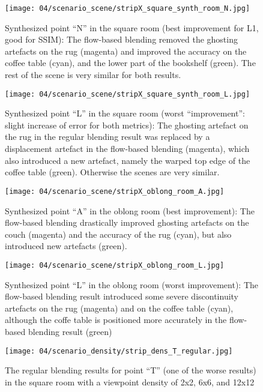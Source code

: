 \begin{figure}
  \centering
  \texttt{[image: 04/scenario\_scene/stripX\_square\_synth\_room\_N.jpg]}
  \caption[Synthesized point ``N'' in the square room]{Synthesized point ``N'' in the square room (best improvement for L1, good for SSIM): The flow-based blending removed the ghosting artefacts on the rug (magenta) and improved the accuracy on the coffee table (cyan), and the lower part of the bookshelf (green). The rest of the scene is very similar for both results.}
  \label{fig:scene_square_N}
\end{figure}

\begin{figure}
  \centering
  \texttt{[image: 04/scenario\_scene/stripX\_square\_synth\_room\_L.jpg]}
  \caption[Synthesized point ``L'' in the square scene]{Synthesized point ``L'' in the square room (worst ``improvement'': slight increase of error for both metrics): The ghosting artefact on the rug in the regular blending result was replaced by a displacement artefact in the flow-based blending (magenta), which also introduced a new artefact, namely the warped top edge of the coffee table (green). Otherwise the scenes are very similar.}
  \label{fig:scene_square_L}
\end{figure}

\begin{figure}
  \centering
  \texttt{[image: 04/scenario\_scene/stripX\_oblong\_room\_A.jpg]}
  \caption{Synthesized point ``A'' in the oblong room (best improvement): The flow-based blending drastically improved ghosting artefacts on the couch (magenta) and the accuracy of the rug (cyan), but also introduced new artefacts (green).}
  \label{fig:scene_oblong_A}
\end{figure}

\begin{figure}
  \centering
  \texttt{[image: 04/scenario\_scene/stripX\_oblong\_room\_L.jpg]}
  \caption{Synthesized point ``L'' in the oblong room (worst improvement): The flow-based blending result introduced some severe discontinuity artefacts on the rug (magenta) and on the coffee table (cyan), although the coffe table is positioned more accurately in the flow-based blending result (green)}
  \label{fig:scene_oblong_L}
\end{figure}

\begin{figure}
		\centering
    \texttt{[image: 04/scenario\_density/strip\_dens\_T\_regular.jpg]}
		\caption{The regular blending results for point ``T'' (one of the worse results) in the square room with a viewpoint density of 2x2, 6x6, and 12x12}
		\label{fig:density_regular_T}
\end{figure}

